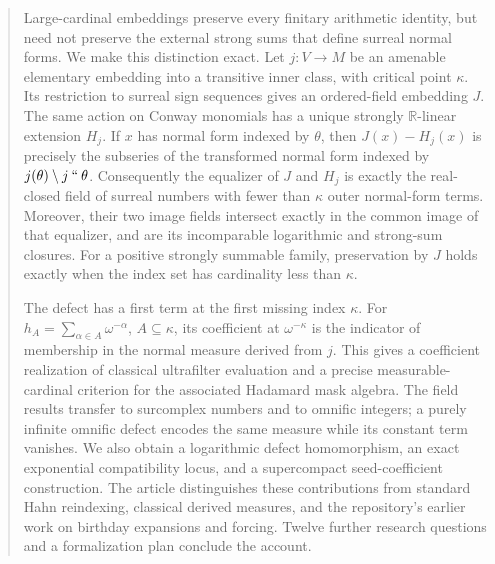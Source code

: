 \documentclass[11pt,letterpaper]{article}
\numberwithin{equation}{section}
\theoremstyle{definition}
\theoremstyle{remark}
\newcommand{\R}{\mathbb R}
\newcommand{\imset}[2]{#1\mathbin{``}#2}
\begin{document}
\hypersetup{pageanchor=true}

\begin{abstract}
Large-cardinal embeddings preserve every finitary arithmetic identity, but
need not preserve the external strong sums that define surreal normal forms.
We make this distinction exact. Let $j:V\to M$ be an amenable elementary
embedding into a transitive inner class, with critical point $\kappa$. Its
restriction to surreal sign sequences gives an ordered-field embedding $J$.
The same action on Conway monomials has a unique strongly $\R$-linear
extension $H_j$. If $x$ has normal form indexed by $\theta$, then $J(x)-H_j(x)$
is precisely the subseries of the transformed normal form indexed by
$j(\theta)\setminus\imset j\theta$. Consequently the equalizer of $J$ and
$H_j$ is exactly the real-closed field of surreal numbers with fewer than
$\kappa$ outer normal-form terms. Moreover, their two image fields intersect
exactly in the common image of that equalizer, and are its incomparable
logarithmic and strong-sum closures. For a positive strongly
summable family, preservation by $J$ holds exactly when the index set has
cardinality less than $\kappa$.

The defect has a first term at the first missing index $\kappa$. For
$h_A=\sum_{\alpha\in A}\omega^{-\alpha}$, $A\subseteq\kappa$, its coefficient
at $\omega^{-\kappa}$ is the indicator of membership in the normal measure
derived from $j$. This gives a coefficient realization of classical
ultrafilter evaluation and a precise measurable-cardinal criterion for the
associated Hadamard mask algebra. The field results transfer to surcomplex
numbers and to omnific integers; a purely infinite omnific defect encodes the
same measure while its constant term vanishes. We also obtain a logarithmic
defect homomorphism, an exact exponential compatibility locus, and a
supercompact seed-coefficient construction. The
article distinguishes these contributions from standard Hahn reindexing,
classical derived measures, and the repository's earlier work on birthday
expansions and forcing. Twelve further research questions and a formalization
plan conclude the account.


\end{abstract}
\end{document}
